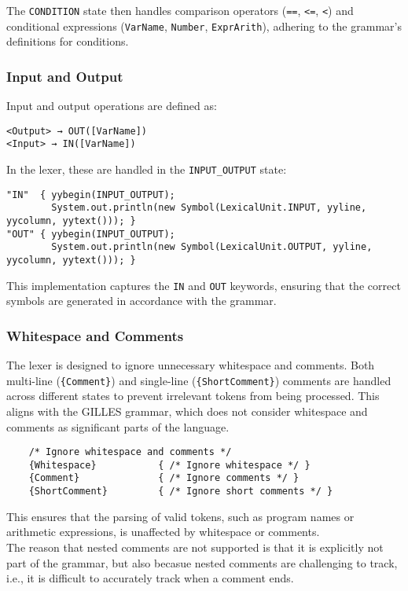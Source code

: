 \documentclass{article}
\begin{document}
	The \texttt{CONDITION} state then handles comparison operators (\texttt{==}, \texttt{<=}, \texttt{<}) and conditional expressions (\texttt{VarName}, \texttt{Number}, \texttt{ExprArith}), adhering to the grammar's definitions for conditions.

	\subsubsection{Input and Output}
	Input and output operations are defined as:

	\begin{verbatim}
<Output> → OUT([VarName])
<Input> → IN([VarName])
	\end{verbatim}

	In the lexer, these are handled in the \texttt{INPUT\_OUTPUT} state:

	\begin{verbatim}
"IN"  { yybegin(INPUT_OUTPUT);
        System.out.println(new Symbol(LexicalUnit.INPUT, yyline, yycolumn, yytext())); }
"OUT" { yybegin(INPUT_OUTPUT);
        System.out.println(new Symbol(LexicalUnit.OUTPUT, yyline, yycolumn, yytext())); }
	\end{verbatim}

	This implementation captures the \texttt{IN} and \texttt{OUT} keywords, ensuring that the correct symbols are generated in accordance with the grammar.


	\subsubsection{Whitespace and Comments}
	The lexer is designed to ignore unnecessary whitespace and comments. Both multi-line (\texttt{\{Comment\}}) and single-line (\texttt{\{ShortComment\}}) comments are handled across different states to prevent irrelevant tokens from being processed. This aligns with the GILLES grammar, which does not consider whitespace and comments as significant parts of the language.

	\begin{verbatim}
	/* Ignore whitespace and comments */
	{Whitespace}           { /* Ignore whitespace */ }
	{Comment}              { /* Ignore comments */ }
	{ShortComment}         { /* Ignore short comments */ }
	\end{verbatim}

	This ensures that the parsing of valid tokens, such as program names or arithmetic expressions, is unaffected by whitespace or comments.\\
	The reason that nested comments are not supported is that it is explicitly not part of the grammar, but also becasue nested comments are challenging to track, i.e., it
	is difficult to accurately track when a comment ends.\\
\end{document}

